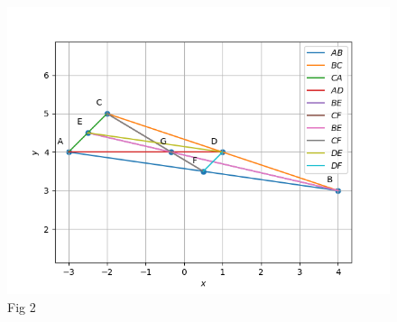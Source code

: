 \documentclass[journal,12pt,twocolumn]{IEEEtran}
\theoremstyle{remark}
\begin{document}
\begin{figure}[h!]
\centering

\includegraphics[width=\columnwidth] {./figs/fig18.png}
\caption{ Fig 2}
\label{fig2: midpoints}
\end{figure}
\end{document}
